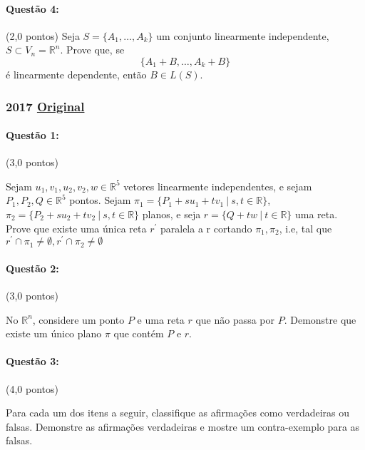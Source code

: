 \documentclass[12pt,a4paper]{article}
\newcommand{\original}[1]{\tiny \href{#1}{Original} \normalsize}
\begin{document}
\paragraph{Questão 4:} (2,0 pontos) Seja $S = \{A_1, \dots, A_k\}$ um conjunto linearmente independente, $S \subset V_n = \mathbb{R}^n$. Prove que, se 
\begin{equation*}
    \{A_1 + B, \dots, A_k + B\}
\end{equation*}
é linearmente dependente, então $B \in L(S)$.

\newpage

\subsubsection{2017 \original{https://drive.google.com/file/d/1mv1XwBoZOp0ZJX1vPB-VQ5WNS_Xx_KLM/view?usp=sharing}}
\paragraph{Questão 1:} (3,0 pontos)

Sejam $u_1,v_1,u_2,v_2,w \in \mathbb{R}^5$ vetores linearmente independentes, e sejam $P_1,P_2,Q \in \mathbb{R}^5$ pontos. Sejam $\pi_1=\{P_1+su_1+tv_1 \ | \ s,t \in \mathbb{R}\}$, $\pi_2=\{P_2+su_2+tv_2 \ | \ s,t \in \mathbb{R}\}$ planos, e seja $r=\{ Q+tw \ | \ t \in \mathbb{R}\}$ uma reta. Prove que existe uma única reta $r^\prime $ paralela a r cortando $\pi_1,\pi_2$, i.e, tal que $r^\prime \cap \pi_1 \neq \emptyset,r^\prime \cap \pi_2 \neq \emptyset$

\paragraph{Questão 2:} (3,0 pontos)

No $\mathbb{R}^n$, considere um ponto $P$ e uma reta $r$ que não passa por $P$. Demonstre que existe um único plano $\pi$ que contém $P$ e $r$.

\paragraph{Questão 3:} (4,0 pontos)

Para cada um dos itens a seguir, classifique as afirmações como verdadeiras ou falsas. Demonstre as afirmações verdadeiras e mostre um contra-exemplo para as falsas.
\end{document}
